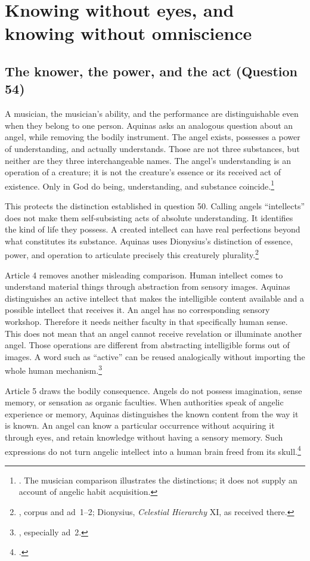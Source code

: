 \section{Knowing without eyes, and knowing without omniscience}
\label{sec:angel-knowledge}

\subsection{The knower, the power, and the act (Question 54)}

A musician, the musician's ability, and the performance are distinguishable even when they belong to one person. Aquinas asks an analogous question about an angel, while removing the bodily instrument. The angel exists, possesses a power of understanding, and actually understands. Those are not three substances, but neither are they three interchangeable names. The angel's understanding is an operation of a creature; it is not the creature's essence or its received act of existence. Only in God do being, understanding, and substance coincide.\footnote{. The musician comparison illustrates the distinctions; it does not supply an account of angelic habit acquisition.}

This protects the distinction established in question 50. Calling angels ``intellects'' does not make them self-subsisting acts of absolute understanding. It identifies the kind of life they possess. A created intellect can have real perfections beyond what constitutes its substance. Aquinas uses Dionysius's distinction of essence, power, and operation to articulate precisely this creaturely plurality.\footnote{, corpus and ad~1--2; Dionysius, \emph{Celestial Hierarchy} XI, as received there.}

Article 4 removes another misleading comparison. Human intellect comes to understand material things through abstraction from sensory images. Aquinas distinguishes an active intellect that makes the intelligible content available and a possible intellect that receives it. An angel has no corresponding sensory workshop. Therefore it needs neither faculty in that specifically human sense. This does not mean that an angel cannot receive revelation or illuminate another angel. Those operations are different from abstracting intelligible forms out of images. A word such as ``active'' can be reused analogically without importing the whole human mechanism.\footnote{, especially ad~2.}

Article 5 draws the bodily consequence. Angels do not possess imagination, sense memory, or sensation as organic faculties. When authorities speak of angelic experience or memory, Aquinas distinguishes the known content from the way it is known. An angel can know a particular occurrence without acquiring it through eyes, and retain knowledge without having a sensory memory. Such expressions do not turn angelic intellect into a human brain freed from its skull.\footnote{.}

